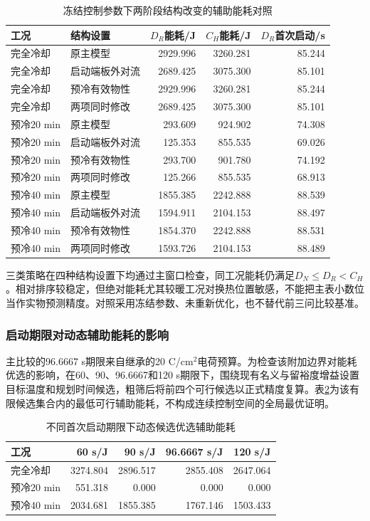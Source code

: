 \documentclass[bwprint]{gmcmthesis}
\numberwithin{equation}{section}
\numberwithin{figure}{section}
\begin{document}
\begin{table}[htbp]
\centering
\caption{冻结控制参数下两阶段结构改变的辅助能耗对照}
\label{tab:q4:structure}
\small
\begin{tabular}{l l r r r}
\toprule
工况 & 结构设置 & $D_R$能耗/J & $C_H$能耗/J & $D_R$首次启动/s\\
\midrule
完全冷却 & 原主模型 & 2929.996 & 3260.281 & 85.244 \\
完全冷却 & 启动端板外对流 & 2689.425 & 3075.300 & 85.101 \\
完全冷却 & 预冷有效物性 & 2929.996 & 3260.281 & 85.244 \\
完全冷却 & 两项同时修改 & 2689.425 & 3075.300 & 85.101 \\
预冷20 min & 原主模型 & 293.609 & 924.902 & 74.308 \\
预冷20 min & 启动端板外对流 & 125.353 & 855.535 & 69.026 \\
预冷20 min & 预冷有效物性 & 293.700 & 901.780 & 74.192 \\
预冷20 min & 两项同时修改 & 125.266 & 855.535 & 68.913 \\
预冷40 min & 原主模型 & 1855.385 & 2242.888 & 88.539 \\
预冷40 min & 启动端板外对流 & 1594.911 & 2104.153 & 88.497 \\
预冷40 min & 预冷有效物性 & 1854.370 & 2242.888 & 88.531 \\
预冷40 min & 两项同时修改 & 1593.726 & 2104.153 & 88.489 \\
\bottomrule
\end{tabular}
\end{table}

三类策略在四种结构设置下均通过主窗口检查，同工况能耗仍满足$D_N\leq D_R<C_H$。相对排序较稳定，但绝对能耗尤其较暖工况对换热位置敏感，不能把主表小数位当作实物预测精度。对照采用冻结参数、未重新优化，也不替代前三问比较基准。

\subsubsection{启动期限对动态辅助能耗的影响}

主比较的96.6667 s期限来自继承的20 C/cm$^2$电荷预算。为检查该附加边界对能耗优选的影响，在60、90、96.6667和120 s期限下，围绕现有名义与留裕度增益设置目标温度和规划时间候选，粗筛后将前四个可行候选以正式精度复算。表\ref{tab:q4:deadline}为该有限候选集合内的最低可行辅助能耗，不构成连续控制空间的全局最优证明。

\begin{table}[htbp]
\centering
\caption{不同首次启动期限下动态候选优选辅助能耗}
\label{tab:q4:deadline}
\begin{tabular}{l r r r r}
\toprule
工况 & 60 s/J & 90 s/J & 96.6667 s/J & 120 s/J\\
\midrule
完全冷却 & 3274.804 & 2896.517 & 2855.408 & 2647.064 \\
预冷20 min & 551.318 & 0.000 & 0.000 & 0.000 \\
预冷40 min & 2034.681 & 1855.385 & 1767.146 & 1503.433 \\
\bottomrule
\end{tabular}
\end{table}
\end{document}
